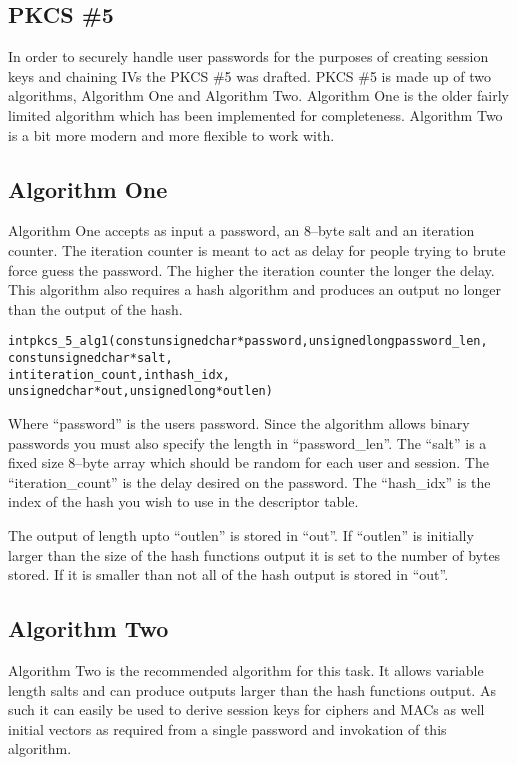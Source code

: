 \documentclass[a4paper]{book}
\begin{document}
\subsection{PKCS \#5}
In order to securely handle user passwords for the purposes of creating session keys and chaining IVs the PKCS \#5 was drafted.   PKCS \#5
is made up of two algorithms, Algorithm One and Algorithm Two.  Algorithm One is the older fairly limited algorithm which has been implemented
for completeness.  Algorithm Two is a bit more modern and more flexible to work with.

\subsection{Algorithm One}
Algorithm One accepts as input a password, an 8--byte salt and an iteration counter.  The iteration counter is meant to act as delay for
people trying to brute force guess the password.  The higher the iteration counter the longer the delay.  This algorithm also requires a hash 
algorithm and produces an output no longer than the output of the hash.  

\begin{alltt}
int pkcs_5_alg1(const unsigned char *password, unsigned long password_len, 
                const unsigned char *salt, 
                int iteration_count,  int hash_idx,
                unsigned char *out,   unsigned long *outlen)
\end{alltt}
Where ``password'' is the users password.  Since the algorithm allows binary passwords you must also specify the length in ``password\_len''.  
The ``salt'' is a fixed size 8--byte array which should be random for each user and session.  The ``iteration\_count'' is the delay desired
on the password.  The ``hash\_idx'' is the index of the hash you wish to use in the descriptor table.  

The output of length upto ``outlen'' is stored in ``out''.  If ``outlen'' is initially larger than the size of the hash functions output
it is set to the number of bytes stored.  If it is smaller than not all of the hash output is stored in ``out''.

\subsection{Algorithm Two}

Algorithm Two is the recommended algorithm for this task.  It allows variable length salts and can produce outputs larger than the 
hash functions output.  As such it can easily be used to derive session keys for ciphers and MACs as well initial vectors as required
from a single password and invokation of this algorithm.
\end{document}
